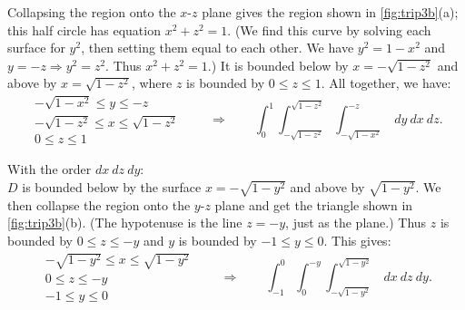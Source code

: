{Collapsing the region onto the $x$-$z$ plane gives the region shown in \autoref{fig:trip3b}(a); this half circle has equation $x^2+z^2=1$. (We find this curve by solving each surface for $y^2$, then setting them equal to each other. We have $y^2=1-x^2$ and $y=-z\Rightarrow y^2=z^2$. Thus $x^2+z^2=1$.) It is bounded below by $x=-\sqrt{1-z^2}$ and above by $x=\sqrt{1-z^2}$, where $z$ is bounded by $0\leq z\leq 1$. All together, we have:
\[
 \begin{gathered}
  -\sqrt{1-x^2}\leq y\leq -z\\
  -\sqrt{1-z^2}\leq x\leq \sqrt{1-z^2}\\
  0\leq z\leq 1
 \end{gathered}
 \qquad\Rightarrow\qquad
 \int_{0}^1\int_{-\sqrt{1-z^2}}^{\sqrt{1-z^2}}\int_{-\sqrt{1-x^2}}^{-z}\ dy\ dx\ dz.
\]

\noindent With the order $dx\ dz\ dy$:\\

$D$ is bounded below by the surface $x=-\sqrt{1-y^2}$ and above by $\sqrt{1-y^2}$. We then collapse the region onto the $y$-$z$ plane and get the triangle shown in \autoref{fig:trip3b}(b). (The hypotenuse is the line $z=-y$, just as the plane.) Thus $z$ is bounded by $0\leq z\leq -y$ and $y$ is bounded by $-1\leq y\leq 0$. This gives:
\[
 \begin{gathered}
  -\sqrt{1-y^2}\leq x\leq \sqrt{1-y^2}\\
  0\leq z\leq -y\\
  -1\leq y\leq 0
 \end{gathered}
 \qquad\Rightarrow\qquad
 \int_{-1}^0\int_{0}^{-y}\int_{-\sqrt{1-y^2}}^{\sqrt{1-y^2}}\ dx\ dz\ dy.
\]}

